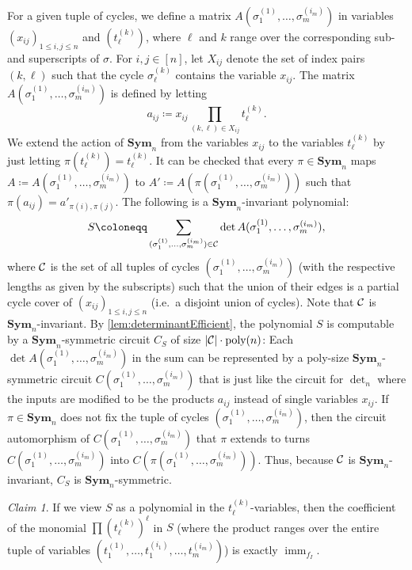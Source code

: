 \documentclass[11pt, DIV=15]{scrarticle}
\theoremstyle{definition}
\theoremstyle{plain}
\theoremstyle{remark}
\newtheorem{claim}{Claim}[definition]
\newcommand{\Cc}{{\cal C}}
\newcommand{\Sym}{\mathbf{Sym}}
\DeclareMathOperator{\imm}{imm}
\begin{document}
For a given tuple of cycles, we define a matrix $A(\sigma_1^{(1)},\dots ,\sigma_{m}^{(i_m)})$ in variables $(x_{ij})_{1 \leq i,j \leq n}$ and $(t_\ell^{(k)})$, where $\ell$ and $k$ range over the corresponding sub- and superscripts of $\sigma$. For $i,j \in [n]$, let $X_{ij}$ denote the set of index pairs $(k,\ell)$ such that the cycle $\sigma_{\ell}^{(k)}$ contains the variable $x_{ij}$. The matrix $A(\sigma_1^{(1)},\dots ,\sigma_{m}^{(i_m)})$ is defined by letting
\[
a_{ij} \coloneqq x_{ij}\prod_{(k,\ell) \in X_{ij}} t^{(k)}_{\ell}. 
\]
We extend the action of $\Sym_n$ from the variables $x_{ij}$ to the variables $t_\ell^{(k)}$ by just letting $\pi(t_\ell^{(k)}) = t_\ell^{(k)}$.
It can be checked that every $\pi \in \Sym_n$ maps $A \coloneqq A(\sigma_1^{(1)},\dots ,\sigma_{m}^{(i_m)})$ to $A' \coloneqq A(\pi(\sigma_1^{(1)},\dots ,\sigma_{m}^{(i_m)}))$ such that $\pi(a_{ij}) = a'_{\pi(i),\pi(j)}$. 
The following is a $\Sym_n$-invariant polynomial:
\[
S \coloneqq \sum_{(\sigma_1^{(1)},\dots ,\sigma_{m}^{(i_m)}) \in \Cc} \det A(\sigma_1^{(1)},\dots ,\sigma_{m}^{(i_m)}),
\]
where $\Cc$ is the set of all tuples of cycles $(\sigma_1^{(1)},\dots ,\sigma_{m}^{(i_m)})$ (with the respective lengths as given by the subscripts) such that the union of their edges is a partial cycle cover of $(x_{ij})_{1 \leq i,j \leq n}$ (i.e.\ a disjoint union of cycles). 
Note that $\Cc$ is $\Sym_n$-invariant. 
By \cref{lem:determinantEfficient}, the polynomial $S$ is computable by a $\Sym_n$-symmetric circuit $C_S$ of size $|\Cc| \cdot \text{poly}(n)$: Each $\det A(\sigma_1^{(1)},\dots ,\sigma_{m}^{(i_m)})$ in the sum can be represented by a poly-size $\Sym_n$-symmetric circuit $C(\sigma_1^{(1)},\dots ,\sigma_{m}^{(i_m)})$ that is just like the circuit for $\det_n$ where the inputs are modified to be the products $a_{ij}$ instead of single variables $x_{ij}$. If $\pi \in \Sym_n$ does not fix the tuple of cycles $(\sigma_1^{(1)},\dots ,\sigma_{m}^{(i_m)})$, then the circuit automorphism of $C(\sigma_1^{(1)},\dots ,\sigma_{m}^{(i_m)})$ that $\pi$ extends to turns $C(\sigma_1^{(1)},\dots ,\sigma_{m}^{(i_m)})$ into $C(\pi(\sigma_1^{(1)},\dots ,\sigma_{m}^{(i_m)}))$. 
Thus, because $\Cc$ is $\Sym_n$-invariant, $C_S$ is $\Sym_n$-symmetric.\\
\begin{claim}\label{imm:claim1} If we view $S$ as a polynomial in the $t_\ell^{(k)}$-variables, then the coefficient of the monomial $\prod (t_\ell^{(k)})^\ell$ in $S$ (where the product ranges over the entire tuple of variables $(t_1^{(1)},\dots ,t_1^{(i_1)},\dots ,t_m^{(i_m)})$) is exactly $\imm_{f_I}$.
\end{claim}
\end{document}
